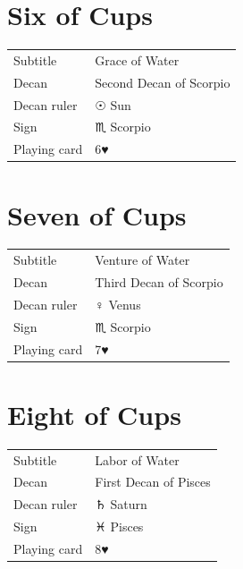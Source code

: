 \newpage
\section*{Six of Cups}

\begin{center}
\end{center}

\vspace{4mm}
\noindent\begin{tabular}{@{}l@{\quad}l@{}}
Subtitle & Grace of Water \\
Decan & Second Decan of Scorpio \\
Decan ruler & {\symbfont ☉} Sun \\
Sign & {\symbfont ♏} Scorpio \\
Playing card & 6♥ \\
\end{tabular}

\newpage
\section*{Seven of Cups}

\begin{center}
\end{center}

\vspace{4mm}
\noindent\begin{tabular}{@{}l@{\quad}l@{}}
Subtitle & Venture of Water \\
Decan & Third Decan of Scorpio \\
Decan ruler & {\symbfont ♀} Venus \\
Sign & {\symbfont ♏} Scorpio \\
Playing card & 7♥ \\
\end{tabular}

\newpage
\section*{Eight of Cups}

\begin{center}
\end{center}

\vspace{4mm}
\noindent\begin{tabular}{@{}l@{\quad}l@{}}
Subtitle & Labor of Water \\
Decan & First Decan of Pisces \\
Decan ruler & {\symbfont ♄} Saturn \\
Sign & {\symbfont ♓} Pisces \\
Playing card & 8♥ \\
\end{tabular}

